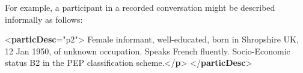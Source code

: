 For example, a participant in a recorded conversation might be described informally as follows: \par\bgroup{}\exampleFont \begin{shaded}\noindent\mbox{}{<\textbf{particDesc}\hspace*{1em}{xml:id}="{p2}">}\mbox{}\newline 
{}Female informant, well-educated, born in Shropshire UK, 12 Jan\mbox{}\newline 
\hspace*{1em}\hspace*{1em} 1950, of unknown occupation. Speaks French fluently.\mbox{}\newline 
\hspace*{1em}\hspace*{1em} Socio-Economic status B2 in the PEP classification scheme.{</\textbf{p}>}\mbox{}\newline 
{</\textbf{particDesc}>}\end{shaded}\egroup\par \par
